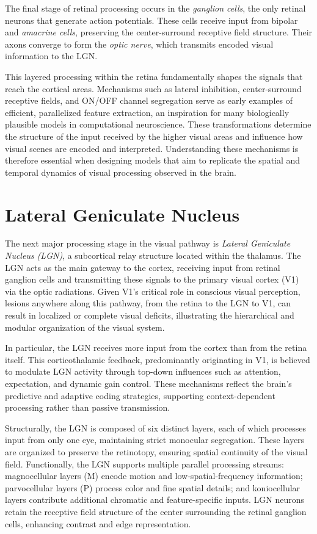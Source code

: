 The final stage of retinal processing occurs in the \emph{ganglion cells}, the only retinal neurons that generate action potentials. These cells receive input from bipolar and \emph{amacrine cells}, preserving the center-surround receptive field structure. Their axons converge to form the \emph{optic nerve}, which transmits encoded visual information to the LGN.

This layered processing within the retina fundamentally shapes the signals that reach the cortical areas. Mechanisms such as lateral inhibition, center-surround receptive fields, and ON/OFF channel segregation serve as early examples of efficient, parallelized feature extraction, an inspiration for many biologically plausible models in computational neuroscience. These transformations determine the structure of the input received by the higher visual areas and influence how visual scenes are encoded and interpreted. Understanding these mechanisms is therefore essential when designing models that aim to replicate the spatial and temporal dynamics of visual processing observed in the brain.

\section{Lateral Geniculate Nucleus}
\label{sec:lgn}
The next major processing stage in the visual pathway is \emph{Lateral Geniculate Nucleus (LGN)}, a subcortical relay structure located within the thalamus. The LGN acts as the main gateway to the cortex, receiving input from retinal ganglion cells and transmitting these signals to the primary visual cortex (V1) via the optic radiations. Given V1's critical role in conscious visual perception, lesions anywhere along this pathway, from the retina to the LGN to V1, can result in localized or complete visual deficits, illustrating the hierarchical and modular organization of the visual system.

In particular, the LGN receives more input from the cortex than from the retina itself. This corticothalamic feedback, predominantly originating in V1, is believed to modulate LGN activity through top-down influences such as attention, expectation, and dynamic gain control. These mechanisms reflect the brain's predictive and adaptive coding strategies, supporting context-dependent processing rather than passive transmission.

Structurally, the LGN is composed of six distinct layers, each of which processes input from only one eye, maintaining strict monocular segregation. These layers are organized to preserve the retinotopy, ensuring spatial continuity of the visual field. Functionally, the LGN supports multiple parallel processing streams: magnocellular layers (M) encode motion and low-spatial-frequency information; parvocellular layers (P) process color and fine spatial details; and koniocellular layers contribute additional chromatic and feature-specific inputs. LGN neurons retain the receptive field structure of the center surrounding the retinal ganglion cells, enhancing contrast and edge representation.

